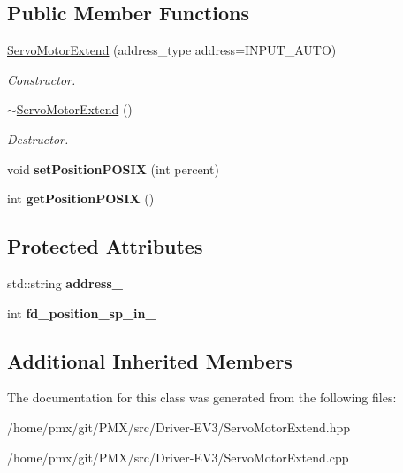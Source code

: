 \subsection*{Public Member Functions}
\begin{DoxyCompactItemize}
\item 
\mbox{\label{classServoMotorExtend_abd1dece064abf22c96ded01482f8fa1d}} 
\hyperlink{classServoMotorExtend_abd1dece064abf22c96ded01482f8fa1d}{Servo\+Motor\+Extend} (address\+\_\+type address=I\+N\+P\+U\+T\+\_\+\+A\+U\+TO)
\begin{DoxyCompactList}\small\item\em Constructor. \end{DoxyCompactList}\item 
\mbox{\label{classServoMotorExtend_a108afce56ad934c7928890b13c42ef86}} 
\hyperlink{classServoMotorExtend_a108afce56ad934c7928890b13c42ef86}{$\sim$\+Servo\+Motor\+Extend} ()
\begin{DoxyCompactList}\small\item\em Destructor. \end{DoxyCompactList}\item 
\mbox{\label{classServoMotorExtend_ade6ba0fcc146bbe686032a01d97266a5}} 
void {\bfseries set\+Position\+P\+O\+S\+IX} (int percent)
\item 
\mbox{\label{classServoMotorExtend_a98307439e69b72c7d121fb11122910e7}} 
int {\bfseries get\+Position\+P\+O\+S\+IX} ()
\end{DoxyCompactItemize}
\subsection*{Protected Attributes}
\begin{DoxyCompactItemize}
\item 
\mbox{\label{classServoMotorExtend_aa080eb1bd95a047db964706b225b3725}} 
std\+::string {\bfseries address\+\_\+}
\item 
\mbox{\label{classServoMotorExtend_a45d611a2bbc75a34fa8af85bf3f54afd}} 
int {\bfseries fd\+\_\+position\+\_\+sp\+\_\+in\+\_\+}
\end{DoxyCompactItemize}
\subsection*{Additional Inherited Members}


The documentation for this class was generated from the following files\+:\begin{DoxyCompactItemize}
\item 
/home/pmx/git/\+P\+M\+X/src/\+Driver-\/\+E\+V3/Servo\+Motor\+Extend.\+hpp\item 
/home/pmx/git/\+P\+M\+X/src/\+Driver-\/\+E\+V3/Servo\+Motor\+Extend.\+cpp\end{DoxyCompactItemize}
